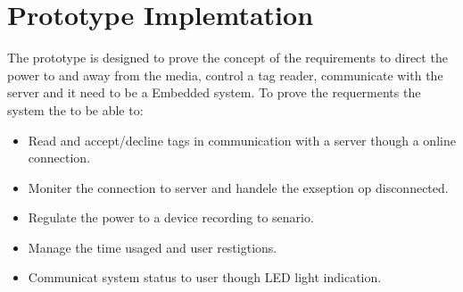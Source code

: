 \section{Prototype Implemtation}
The prototype is designed to prove the concept of the requirements to direct the power to and away from the media, control a tag reader, communicate with the server and it need to be a Embedded system. \newline
To prove the requerments the system the to be able to: 

\begin{itemize}
	\item Read and accept/decline tags in communication with a server though a online connection.
	\item Moniter the connection to server and handele the exseption op disconnected.
	\item Regulate the power to a device recording to senario.
	\item Manage the time usaged and user restigtions. 
	\item Communicat system status to user though LED light indication. 
\end{itemize}




    